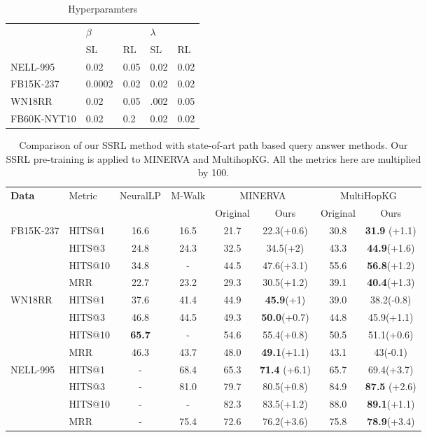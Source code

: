\documentclass[lettersize,journal]{IEEEtran}
\begin{document}
\begin{table}[]
\centering
\caption{Hyperparamters}
\begin{tabular}{lllll}
\hline
            & \multicolumn{2}{l}{$\beta$} & \multicolumn{2}{l}{$\lambda$} \\
            & SL           & RL        & SL           & RL          \\
\hline
NELL-995    & 0.02         & 0.05      & 0.02         & 0.02        \\
FB15K-237   & 0.0002       & 0.02      & 0.02         & 0.02        \\
WN18RR      & 0.02         & 0.05      & .002         & 0.05        \\
FB60K-NYT10 & 0.02         & 0.2       & 0.02         & 0.02       \\
\hline
\end{tabular}

\label{hyperparameter}
\end{table}


\begin{table}
\centering
\caption{Comparison of our SSRL method with state-of-art path based query answer methods. Our SSRL pre-training is applied to MINERVA and MultihopKG. All the metrics here are multiplied by 100. 
}
\begin{tabular}{llcccccc}
\hline
\multirow{2}{4em}{\textbf{Data}} & \multirow{2}{4em}{Metric}& \multirow{2}{4em}{NeuralLP} &\multirow{2}{4em}{M-Walk}& \multicolumn{2}{c}{MINERVA}  &\multicolumn{2}{c}{MultiHopKG} \\
&&&&Original&Ours&Original&Ours\\
\hline
\multirow{4}{4em}{FB15K-237} & HITS@1&16.6& 16.5& 21.7& 22.3(+0.6)&30.8&\textbf{31.9} (+1.1)\\
& HITS@3 & 24.8&24.3&32.5&34.5(+2)&43.3&\textbf{44.9}(+1.6)\\
& HITS@10 &34.8&-&44.5&47.6(+3.1)&55.6&\textbf{56.8}(+1.2)\\
& MRR &22.7&23.2&29.3&30.5(+1.2)&39.1&\textbf{40.4}(+1.3)\\
\hline
\multirow{4}{4em}{WN18RR} & HITS@1&37.6&41.4&44.9&\textbf{45.9}(+1)&39.0&38.2(-0.8)\\
& HITS@3 &46.8&44.5&49.3&\textbf{50.0}(+0.7)&44.8&45.9(+1.1)\\
& HITS@10 &\textbf{65.7}&-&54.6&55.4(+0.8)&50.5&51.1(+0.6)\\
& MRR &46.3&43.7&48.0&\textbf{49.1}(+1.1)&43.1&43(-0.1)\\
\hline
\multirow{4}{4em}{NELL-995} & HITS@1&-&68.4&65.3&\textbf{71.4} (+6.1)&65.7&69.4(+3.7)\\
& HITS@3 &-&81.0&79.7&80.5(+0.8)&84.9&\textbf{87.5} (+2.6)\\
& HITS@10 &-&- &82.3 &83.5(+1.2)&88.0&\textbf{89.1}(+1.1)\\
& MRR &-&75.4 &72.6&76.2(+3.6)&75.8&\textbf{78.9}(+3.4)\\
\hline
\end{tabular}

\label{performance comp}
\end{table}
\end{document}
